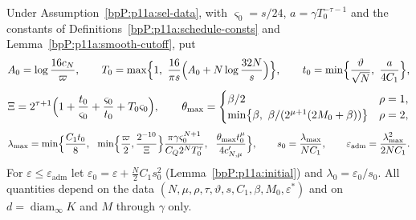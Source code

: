 \begin{definition}\label{bpP:p11a:adm-params}
Under Assumption~\ref{bpP:p11a:sel-data}, with $\varsigma_0=s/24$, $a=\gamma T_0^{-\tau-1}$ and the constants of Definitions~\ref{bpP:p11a:schedule-consts} and Lemma~\ref{bpP:p11a:smooth-cutoff}, put
\[A_0=\log\frac{16c_N}\varpi,\qquad T_0=\max\Bigl\{1,\ \frac{16}{\pi s}\Bigl(A_0+N\log\frac{32N}s\Bigr)\Bigr\},\qquad t_0=\min\Bigl\{\frac\vartheta{\sqrt N},\ \frac a{4C_1}\Bigr\},\]
\[\Xi=2^{\tau+1}\Bigl(1+\frac{t_0}{\varsigma_0}+\frac{\varsigma_0}{t_0}+T_0\varsigma_0\Bigr),\qquad\theta_{\max}=\begin{cases}\beta/2&\rho=1,\\ \min\bigl\{\beta,\ \beta/(2^{\mu+1}(2M_0+\beta))\bigr\}&\rho=2,\end{cases}\]
\[\lambda_{\max}=\min\Bigl\{\frac{C_1t_0}8,\ \ \min\Bigl\{\frac\varpi2,\frac{2^{-10}}\Xi\Bigr\}\frac{\pi\gamma\varsigma_0^{N+1}}{C_Q2^NT_0^\tau},\ \ \frac{\theta_{\max}t_0^\mu}{4c'_{N,\mu}}\Bigr\},\qquad s_0=\frac{\lambda_{\max}}{NC_1},\qquad\varepsilon_{\mathrm{adm}}=\frac{\lambda_{\max}^2}{2NC_1}.\]
For $\varepsilon\le\varepsilon_{\mathrm{adm}}$ let $\varepsilon_0=\varepsilon+\frac N2C_1s_0^2$ (Lemma~\ref{bpP:p11a:initial}) and $\lambda_0=\varepsilon_0/s_0$. All quantities depend on the data $(N,\mu,\rho,\tau,\vartheta,s,C_1,\beta,M_0,\varepsilon^*)$ and on $d=\operatorname{diam}_\infty K$ and $M$ through $\gamma$ only.
\end{definition}


